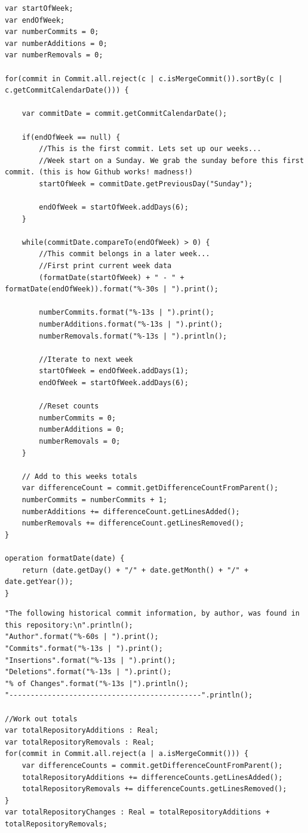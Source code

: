 \documentclass[11pt]{book}
\begin{document}
\begin{appendices}
\begin{lstlisting}[caption=Commit frequency, label=lst:commitfrequency]
var startOfWeek;
var endOfWeek;
var numberCommits = 0;
var numberAdditions = 0;
var numberRemovals = 0;

for(commit in Commit.all.reject(c | c.isMergeCommit()).sortBy(c | c.getCommitCalendarDate())) {
	
	var commitDate = commit.getCommitCalendarDate();
	
	if(endOfWeek == null) {
		//This is the first commit. Lets set up our weeks...
		//Week start on a Sunday. We grab the sunday before this first commit. (this is how Github works! madness!)
		startOfWeek = commitDate.getPreviousDay("Sunday");
					
		endOfWeek = startOfWeek.addDays(6);
	}
	
	while(commitDate.compareTo(endOfWeek) > 0) {
		//This commit belongs in a later week...
		//First print current week data
		(formatDate(startOfWeek) + " - " + formatDate(endOfWeek)).format("%-30s | ").print();

		numberCommits.format("%-13s | ").print();
		numberAdditions.format("%-13s | ").print();
		numberRemovals.format("%-13s | ").println();
		
		//Iterate to next week
		startOfWeek = endOfWeek.addDays(1);
		endOfWeek = startOfWeek.addDays(6);	
		
		//Reset counts
		numberCommits = 0;
		numberAdditions = 0;
		numberRemovals = 0;
	}
	
	// Add to this weeks totals
	var differenceCount = commit.getDifferenceCountFromParent();
	numberCommits = numberCommits + 1;	
	numberAdditions += differenceCount.getLinesAdded();
	numberRemovals += differenceCount.getLinesRemoved();
}

operation formatDate(date) {
	return (date.getDay() + "/" + date.getMonth() + "/" + date.getYear());
}
\end{lstlisting}

\begin{lstlisting}[caption=GitInspector-style output, label=lst:gitinspectorequivilence]
"The following historical commit information, by author, was found in this repository:\n".println();
"Author".format("%-60s | ").print();
"Commits".format("%-13s | ").print();
"Insertions".format("%-13s | ").print();
"Deletions".format("%-13s | ").print();
"% of Changes".format("%-13s |").println();
"---------------------------------------------".println();

//Work out totals
var totalRepositoryAdditions : Real;
var totalRepositoryRemovals : Real;
for(commit in Commit.all.reject(a | a.isMergeCommit())) {
	var differenceCounts = commit.getDifferenceCountFromParent();
	totalRepositoryAdditions += differenceCounts.getLinesAdded();
	totalRepositoryRemovals += differenceCounts.getLinesRemoved();
}
var totalRepositoryChanges : Real = totalRepositoryAdditions + totalRepositoryRemovals;
	

\end{lstlisting}
\end{appendices}
\end{document}
